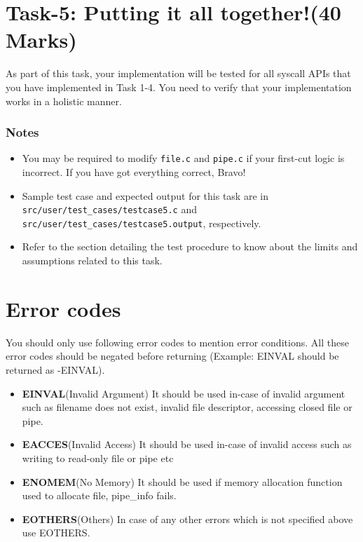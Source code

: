 \documentclass[12pt]{article}
\begin{document}
\section{Task-5: Putting it all together!(40 Marks)}
As part of this task, your implementation will be tested for all syscall APIs that you have implemented in Task 1-4. 
You need to verify that your implementation works in a holistic manner.

\subsubsection*{Notes}

\begin{itemize}
    \item You may be required to modify {\tt file.c} and {\tt pipe.c} if your first-cut logic is incorrect.
          If you have got everything correct, Bravo! 
    \item Sample test case and expected output for this task are in {\tt src/user/test\_cases/testcase5.c}
        and {\tt src/user/test\_cases/testcase5.output}, respectively.
    \item Refer to the section detailing the test procedure to know about the limits and assumptions related to
          this task.
\end{itemize}

\section*{Error codes}
 You should only use following error codes to mention error conditions. All these error codes should be negated before returning (Example: EINVAL should be returned as -EINVAL).
    
    \begin{itemize}
        \item \textbf{EINVAL}(Invalid Argument)  It should be used in-case of invalid argument such as filename does not exist, invalid file descriptor, accessing closed file or pipe.
        \item \textbf{EACCES}(Invalid Access) It should be used in-case of invalid access such as writing to read-only file or pipe etc 
        \item \textbf{ENOMEM}(No Memory) It should be used if memory allocation function used to allocate file, pipe\_info fails.
        \item \textbf{EOTHERS}(Others) In case of any other errors which is not specified above use EOTHERS.
    \end{itemize}{}
\end{document}

